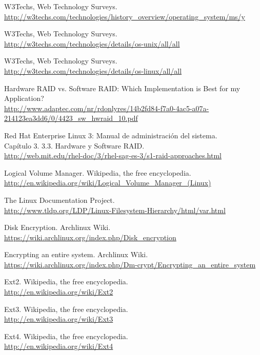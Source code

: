 \documentclass[paper=a4, fontsize=11pt]{scrartcl} %
\numberwithin{equation}{section} %
\numberwithin{figure}{section} %
\numberwithin{table}{section} %
\begin{document}
\begin{thebibliography}{10}
W3Techs, Web Technology Surveys.\\
  \url{http://w3techs.com/technologies/history_overview/operating_system/ms/y}

W3Techs, Web Technology Surveys.\\
  \url{http://w3techs.com/technologies/details/os-unix/all/all}

W3Techs, Web Technology Surveys.\\
  \url{http://w3techs.com/technologies/details/os-linux/all/all}

Hardware RAID vs. Software RAID: Which Implementation is Best for my Application?\\
  \url{http://www.adaptec.com/nr/rdonlyres/14b2fd84-f7a0-4ac5-a07a-214123ea3dd6/0/4423_sw_hwraid_10.pdf}

Red Hat Enterprise Linux 3: Manual de administración del sistema.\\
  Capítulo 3. 3.3. Hardware y Software RAID.\\
  \url{http://web.mit.edu/rhel-doc/3/rhel-sag-es-3/s1-raid-approaches.html}

Logical Volume Manager. Wikipedia, the free encyclopedia.\\
  \url{http://en.wikipedia.org/wiki/Logical_Volume_Manager_(Linux)}

The Linux Documentation Project.\\
  \url{http://www.tldp.org/LDP/Linux-Filesystem-Hierarchy/html/var.html}

Disk Encryption. Archlinux Wiki.\\
  \url{https://wiki.archlinux.org/index.php/Disk_encryption}

Encrypting an entire system. Archlinux Wiki.\\
  \url{https://wiki.archlinux.org/index.php/Dm-crypt/Encrypting_an_entire_system}

Ext2. Wikipedia, the free encyclopedia.\\
  \url{http://en.wikipedia.org/wiki/Ext2}

Ext3. Wikipedia, the free encyclopedia.\\
  \url{http://en.wikipedia.org/wiki/Ext3}

Ext4. Wikipedia, the free encyclopedia.\\
  \url{http://en.wikipedia.org/wiki/Ext4}


\end{thebibliography}
\end{document}
